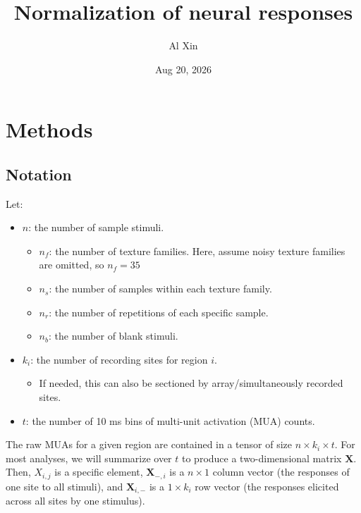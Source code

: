 \documentclass[
  10pt,
  letterpaper,
  DIV=11,
  numbers=noendperiod]{scrartcl}
\title{Normalization of neural responses}
\author{\small Al Xin}
\date{Aug 20, 2026}
\providecommand{\tightlist}{%
  \setlength{\itemsep}{0pt}\setlength{\parskip}{0pt}}
\newcommand{\bfX}{\mathbf{X}}
\begin{document}
\maketitle


\section{Methods}\label{methods}

\subsection{Notation}\label{notation}

Let:

\begin{itemize}
\tightlist
\item
  \(n\): the number of sample stimuli.

  \begin{itemize}
  \tightlist
  \item
    \(n_f\): the number of texture families. Here, assume noisy texture
    families are omitted, so \(n_f = 35\)
  \item
    \(n_s\): the number of samples within each texture family.
  \item
    \(n_r\): the number of repetitions of each specific sample.
  \item
    \(n_b\): the number of blank stimuli.
  \end{itemize}
\item
  \(k_i\): the number of recording sites for region \(i\).

  \begin{itemize}
  \tightlist
  \item
    If needed, this can also be sectioned by array/simultaneously
    recorded sites.
  \end{itemize}
\item
  \(t\): the number of 10 ms bins of multi-unit activation (MUA) counts.
\end{itemize}

The raw MUAs for a given region are contained in a tensor of size
\(n \times k_i \times t\). For most analyses, we will summarize over
\(t\) to produce a two-dimensional matrix \(\bfX\). Then, \(X_{i, j}\)
is a specific element, \(\bfX_{-, i}\) is a \(n \times 1\) column vector
(the responses of one site to all stimuli), and \(\bfX_{i, -}\) is a
\(1 \times k_i\) row vector (the responses elicited across all sites by
one stimulus).
\end{document}
